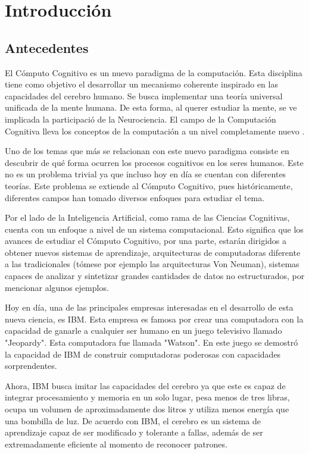 \chapter{Introducci\'{o}n}
\label{ch:intro}

\section{Antecedentes}
El C\'{o}mputo Cognitivo es un nuevo paradigma de la computaci\'{o}n. Esta disciplina tiene como objetivo el desarrollar un mecanismo coherente inspirado en las capacidades del cerebro humano. Se busca implementar una teor\'{i}a universal unificada de la mente humana. De esta forma, al querer estudiar la mente, se ve implicada la participaci\'{o} de la Neurociencia. El campo de la Computaci\'{o}n Cognitiva lleva los conceptos de la computaci\'{o}n a un nivel completamente nuevo \cite{cc}.

Uno de los temas que m\'{a}s se relacionan con este nuevo paradigma consiste en descubrir de qu\'{e} forma ocurren los procesos cognitivos en los seres humanos. Este no es un problema trivial ya que incluso hoy en d\'{i}a se cuentan con diferentes teor\'{i}as. Este problema se extiende al C\'{o}mputo Cognitivo, pues hist\'{o}ricamente, diferentes campos han tomado diversos enfoques para estudiar el tema.

Por el lado de la Inteligencia Artificial, como rama de las Ciencias Cognitivas, cuenta con un enfoque a nivel de un sistema computacional. Esto significa que los avances de estudiar el C\'{o}mputo Cognitivo, por una parte, estar\'{a}n dirigidos a obtener nuevos sistemas de aprendizaje, arquitecturas de computadoras diferente a las tradicionales (t\'{o}mese por ejemplo las arquitecturas Von Neuman), sistemas capaces de analizar y sintetizar grandes cantidades de datos no estructurados, por mencionar algunos ejemplos.

Hoy en d\'{i}a, una de las principales empresas interesadas en el desarrollo de esta nueva ciencia, es IBM. Esta empresa es famosa por crear una computadora con la capacidad de ganarle a cualquier ser humano en un juego televisivo llamado "Jeopardy". Esta computadora fue llamada "Watson". En este juego se demostr\'{o} la capacidad de IBM de construir computadoras poderosas con capacidades sorprendentes. 

Ahora, IBM busca imitar las capacidades del cerebro ya que este es capaz de integrar procesamiento y memoria en un solo lugar, pesa menos de tres libras, ocupa un volumen de aproximadamente dos litros y utiliza menos energ\'{i}a que una bombilla de luz. De acuerdo con IBM, el cerebro es un sistema de aprendizaje capaz de ser modificado y tolerante a fallas, adem\'{a}s de ser extremadamente eficiente al momento de reconocer patrones. 

